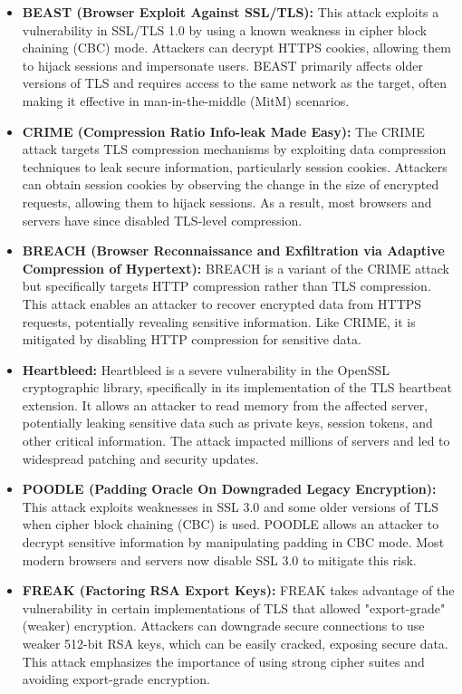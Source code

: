 \begin{itemize}
    \item \textbf{BEAST (Browser Exploit Against SSL/TLS):} This attack exploits a vulnerability in SSL/TLS 1.0 by using a known weakness in cipher block chaining (CBC) mode. Attackers can decrypt HTTPS cookies, allowing them to hijack sessions and impersonate users. BEAST primarily affects older versions of TLS and requires access to the same network as the target, often making it effective in man-in-the-middle (MitM) scenarios.

    \item \textbf{CRIME (Compression Ratio Info-leak Made Easy):} The CRIME attack targets TLS compression mechanisms by exploiting data compression techniques to leak secure information, particularly session cookies. Attackers can obtain session cookies by observing the change in the size of encrypted requests, allowing them to hijack sessions. As a result, most browsers and servers have since disabled TLS-level compression.

    \item \textbf{BREACH (Browser Reconnaissance and Exfiltration via Adaptive Compression of Hypertext):} BREACH is a variant of the CRIME attack but specifically targets HTTP compression rather than TLS compression. This attack enables an attacker to recover encrypted data from HTTPS requests, potentially revealing sensitive information. Like CRIME, it is mitigated by disabling HTTP compression for sensitive data.

    \item \textbf{Heartbleed:} Heartbleed is a severe vulnerability in the OpenSSL cryptographic library, specifically in its implementation of the TLS heartbeat extension. It allows an attacker to read memory from the affected server, potentially leaking sensitive data such as private keys, session tokens, and other critical information. The attack impacted millions of servers and led to widespread patching and security updates.

    \item \textbf{POODLE (Padding Oracle On Downgraded Legacy Encryption):} This attack exploits weaknesses in SSL 3.0 and some older versions of TLS when cipher block chaining (CBC) is used. POODLE allows an attacker to decrypt sensitive information by manipulating padding in CBC mode. Most modern browsers and servers now disable SSL 3.0 to mitigate this risk.

    \item \textbf{FREAK (Factoring RSA Export Keys):} FREAK takes advantage of the vulnerability in certain implementations of TLS that allowed "export-grade" (weaker) encryption. Attackers can downgrade secure connections to use weaker 512-bit RSA keys, which can be easily cracked, exposing secure data. This attack emphasizes the importance of using strong cipher suites and avoiding export-grade encryption.


\end{itemize}

